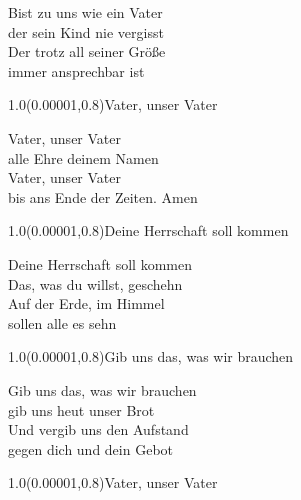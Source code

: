 \documentclass[aspectratio=169]{beamer}
\begin{document}
\color{white}
\begin{frame}
\centering
\color{white}
\huge{Bist zu uns wie ein Vater} \\
\huge{der sein Kind nie vergisst} \\
\huge{Der trotz all seiner Größe} \\
\huge{immer ansprechbar ist} \\

\begin{textblock}{1.0}(0.00001,0.8)\color{gray}\normalsize{Vater, unser Vater}\end{textblock}
\end{frame}

\begin{frame}
\centering
\color{white}
\huge{Vater, unser Vater} \\
\huge{alle Ehre deinem Namen} \\
\huge{Vater, unser Vater} \\
\huge{bis ans Ende der Zeiten. Amen} \\

\begin{textblock}{1.0}(0.00001,0.8)\color{gray}\normalsize{Deine Herrschaft soll kommen}\end{textblock}
\end{frame}

\begin{frame}
\centering
\color{white}
\huge{Deine Herrschaft soll kommen} \\
\huge{Das, was du willst, geschehn} \\
\huge{Auf der Erde, im Himmel} \\
\huge{sollen alle es sehn} \\

\begin{textblock}{1.0}(0.00001,0.8)\color{gray}\normalsize{Gib uns das, was wir brauchen}\end{textblock}
\end{frame}

\begin{frame}
\centering
\color{white}
\huge{Gib uns das, was wir brauchen} \\
\huge{gib uns heut unser Brot} \\
\huge{Und vergib uns den Aufstand} \\
\huge{gegen dich und dein Gebot} \\

\begin{textblock}{1.0}(0.00001,0.8)\color{gray}\normalsize{Vater, unser Vater}\end{textblock}
\end{frame}
\end{document}
